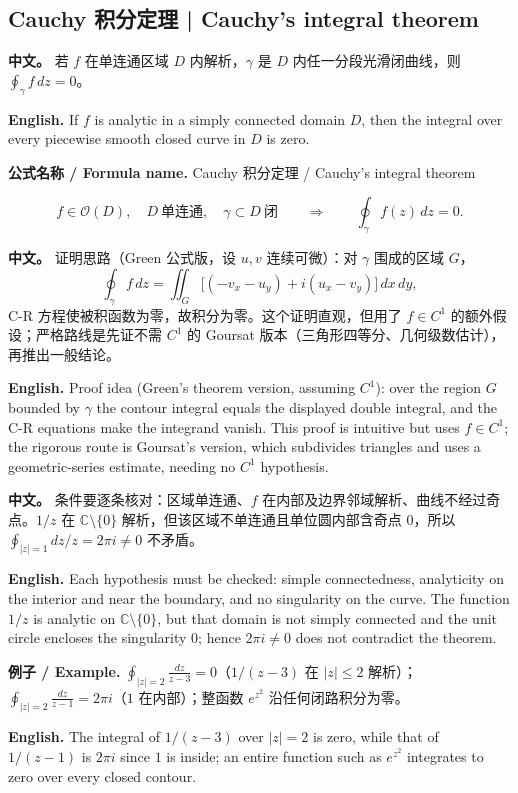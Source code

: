 \documentclass[UTF8,11pt,a4paper]{ctexart}
\newcommand{\EN}[1]{\par\noindent \textbf{English.} #1\par}
\newcommand{\FORMULA}[2]{\par\noindent\textbf{公式名称 / Formula name.} #1 / #2\par}
\newcommand{\EX}[2]{\par\noindent \textbf{例子 / Example.} #1\par\EN{#2}}
\newcommand{\APS}[2]{\par\noindent\textbf{中文。} #1\par\noindent\textbf{English.} #2\par\smallskip}
\begin{document}
\subsection{Cauchy 积分定理 | Cauchy's integral theorem}
\APS{若 $f$ 在单连通区域 $D$ 内解析，$\gamma$ 是 $D$ 内任一分段光滑闭曲线，则 $\oint_\gamma f\,dz=0$。}{If $f$ is analytic in a simply connected domain $D$, then the integral over every piecewise smooth closed curve in $D$ is zero.}
\FORMULA{Cauchy 积分定理}{Cauchy's integral theorem}
\[
f\in\mathcal O(D),\quad D\ \text{单连通},\quad \gamma\subset D\ \text{闭}\qquad\Longrightarrow\qquad\oint_\gamma f(z)\,dz=0.
\]
\APS{证明思路（Green 公式版，设 $u,v$ 连续可微）：对 $\gamma$ 围成的区域 $G$，
\[
\oint_\gamma f\,dz=\iint_G\big[(-v_x-u_y)+i(u_x-v_y)\big]\,dx\,dy,
\]
C-R 方程使被积函数为零，故积分为零。这个证明直观，但用了 $f\in C^1$ 的额外假设；严格路线是先证不需 $C^1$ 的 Goursat 版本（三角形四等分、几何级数估计），再推出一般结论。}{Proof idea (Green's theorem version, assuming $C^1$): over the region $G$ bounded by $\gamma$ the contour integral equals the displayed double integral, and the C-R equations make the integrand vanish. This proof is intuitive but uses $f\in C^1$; the rigorous route is Goursat's version, which subdivides triangles and uses a geometric-series estimate, needing no $C^1$ hypothesis.}
\APS{条件要逐条核对：区域单连通、$f$ 在内部及边界邻域解析、曲线不经过奇点。$1/z$ 在 $\mathbb C\setminus\{0\}$ 解析，但该区域不单连通且单位圆内部含奇点 $0$，所以 $\oint_{|z|=1}dz/z=2\pi i\ne0$ 不矛盾。}{Each hypothesis must be checked: simple connectedness, analyticity on the interior and near the boundary, and no singularity on the curve. The function $1/z$ is analytic on $\mathbb C\setminus\{0\}$, but that domain is not simply connected and the unit circle encloses the singularity $0$; hence $2\pi i\ne0$ does not contradict the theorem.}
\EX{$\oint_{|z|=2}\frac{dz}{z-3}=0$（$1/(z-3)$ 在 $|z|\le2$ 解析）；$\oint_{|z|=2}\frac{dz}{z-1}=2\pi i$（$1$ 在内部）；整函数 $e^{z^2}$ 沿任何闭路积分为零。}{The integral of $1/(z-3)$ over $|z|=2$ is zero, while that of $1/(z-1)$ is $2\pi i$ since $1$ is inside; an entire function such as $e^{z^2}$ integrates to zero over every closed contour.}
\end{document}
